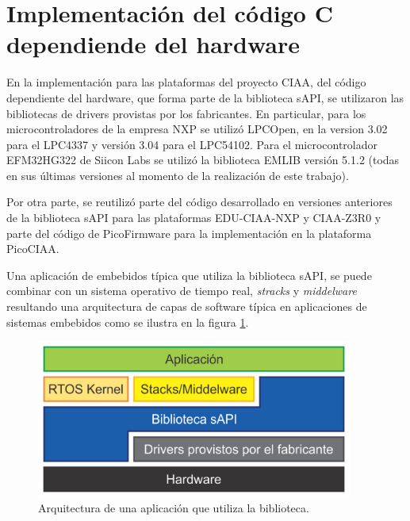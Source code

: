 \section{Implementación del código C dependiende del hardware}
\label{sec:codeImplementation}


En la implementación para las plataformas del proyecto CIAA, del código dependiente del hardware, que forma parte de la biblioteca sAPI, se utilizaron las bibliotecas de drivers provistas por los fabricantes. En particular, para los microcontroladores de la empresa NXP se utilizó LPCOpen, en la version 3.02 para el LPC4337 y versión 3.04 para el LPC54102. Para el microcontrolador EFM32HG322 de Siicon Labs se utilizó la biblioteca EMLIB versión 5.1.2 (todas en sus últimas versiones al momento de la realización de este trabajo).

Por otra parte, se reutilizó parte del código desarrollado en versiones anteriores de la biblioteca sAPI para las plataformas EDU-CIAA-NXP y CIAA-Z3R0 y parte del código de PicoFirmware \citep{PicoAPI} para la implementación en la plataforma PicoCIAA.

Una aplicación de embebidos típica que utiliza la biblioteca sAPI, se puede combinar con un sistema operativo de tiempo real, \emph{stracks} y \emph{middelware} resultando una arquitectura de capas de software típica en aplicaciones de sistemas embebidos como se ilustra en la figura \ref{fig:sapiCapas2}.

\begin{figure}[!htbp]
\begin{center}  %
\includegraphics*[width=10.4cm]{Figures/sapiCapas2.png}
\par\caption{Arquitectura de una aplicación que utiliza la biblioteca.}\label{fig:sapiCapas2}
\end{center}
\end{figure}
